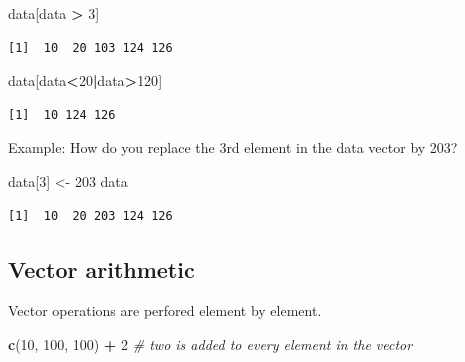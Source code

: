 \documentclass[]{book}
\newenvironment{Shaded}{\begin{snugshade}}{\end{snugshade}}
\newcommand{\CommentTok}[1]{\textcolor[rgb]{0.56,0.35,0.01}{\textit{#1}}}
\newcommand{\DecValTok}[1]{\textcolor[rgb]{0.00,0.00,0.81}{#1}}
\newcommand{\KeywordTok}[1]{\textcolor[rgb]{0.13,0.29,0.53}{\textbf{#1}}}
\newcommand{\NormalTok}[1]{#1}
\newcommand{\OperatorTok}[1]{\textcolor[rgb]{0.81,0.36,0.00}{\textbf{#1}}}
\newcommand{\StringTok}[1]{\textcolor[rgb]{0.31,0.60,0.02}{#1}}
\begin{document}
\begin{Shaded}
\begin{Highlighting}[]
\NormalTok{data[data }\OperatorTok{>}\StringTok{ }\DecValTok{3}\NormalTok{]}
\end{Highlighting}
\end{Shaded}

\begin{verbatim}
[1]  10  20 103 124 126
\end{verbatim}

\begin{Shaded}
\begin{Highlighting}[]
\NormalTok{data[data}\OperatorTok{<}\DecValTok{20}\OperatorTok{|}\NormalTok{data}\OperatorTok{>}\DecValTok{120}\NormalTok{]}
\end{Highlighting}
\end{Shaded}

\begin{verbatim}
[1]  10 124 126
\end{verbatim}

Example: How do you replace the 3rd element in the data vector by 203?

\begin{Shaded}
\begin{Highlighting}[]
\NormalTok{data[}\DecValTok{3}\NormalTok{] <-}\StringTok{ }\DecValTok{203}
\NormalTok{data}
\end{Highlighting}
\end{Shaded}

\begin{verbatim}
[1]  10  20 203 124 126
\end{verbatim}

\hypertarget{vector-arithmetic}{%
\subsection{Vector arithmetic}\label{vector-arithmetic}}

Vector operations are perfored element by element.

\begin{Shaded}
\begin{Highlighting}[]
\KeywordTok{c}\NormalTok{(}\DecValTok{10}\NormalTok{, }\DecValTok{100}\NormalTok{, }\DecValTok{100}\NormalTok{) }\OperatorTok{+}\StringTok{ }\DecValTok{2} \CommentTok{# two is added to every element in the vector}
\end{Highlighting}
\end{Shaded}
\end{document}
